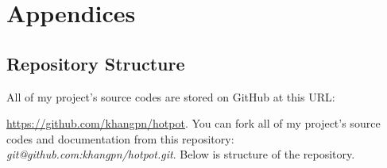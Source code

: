 
\chapter{Appendices}
\label{ch:appendix-b}


\section{Repository Structure}
\label{ch:appendix:repository_structure}  

All of my project's source codes are stored on GitHub at this URL: 

\noindent\href{https://github.com/khangpn/hotpot}{https://github.com/khangpn/hotpot}.
You can fork all of my project's source codes and documentation from this repository: \emph{git@github.com:khangpn/hotpot.git}.
Below is structure of the repository.

